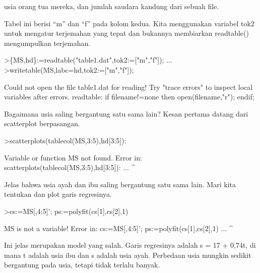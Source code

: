 \documentclass[a4paper,10pt]{article}
\begin{document}
\begin{eulernotebook}
\begin{eulercomment}
\begin{eulercomment}
\begin{eulercomment}
\begin{eulercomment}
\begin{eulercomment}
\begin{eulercomment}
\begin{eulercomment}
\begin{eulercomment}
\begin{eulercomment}
\begin{eulercomment}
\begin{eulercomment}
\begin{eulercomment}
\begin{eulercomment}
\begin{eulercomment}
\begin{eulercomment}
\begin{eulercomment}
\begin{eulercomment}
\begin{eulercomment}
\begin{eulercomment}
usia orang tua mereka, dan jumlah saudara kandung dari sebuah file.

Tabel ini berisi “m” dan “f” pada kolom kedua. Kita menggunakan
variabel tok2 untuk mengatur terjemahan yang tepat dan bukannya
membiarkan readtable() mengumpulkan terjemahan.
\end{eulercomment}
\begin{eulerprompt}
>\{MS,hd\}:=readtable("table1.dat",tok2:=["m","f"]);  ...
>writetable(MS,labc=hd,tok2:=["m","f"]);
\end{eulerprompt}
\begin{euleroutput}
  Could not open the file
  table1.dat
  for reading!
  Try "trace errors" to inspect local variables after errors.
  readtable:
      if filename!=none then open(filename,"r"); endif;
\end{euleroutput}
\begin{eulercomment}
Bagaimana usia saling bergantung satu sama lain? Kesan pertama datang
dari scatterplot berpasangan.
\end{eulercomment}
\begin{eulerprompt}
>scatterplots(tablecol(MS,3:5),hd[3:5]):
\end{eulerprompt}
\begin{euleroutput}
  Variable or function MS not found.
  Error in:
  scatterplots(tablecol(MS,3:5),hd[3:5]): ...
                          ^
\end{euleroutput}
\begin{eulercomment}
Jelas bahwa usia ayah dan ibu saling bergantung satu sama lain. Mari
kita tentukan dan plot garis regresinya.
\end{eulercomment}
\begin{eulerprompt}
>cs:=MS[,4:5]'; ps:=polyfit(cs[1],cs[2],1)
\end{eulerprompt}
\begin{euleroutput}
  MS is not a variable!
  Error in:
  cs:=MS[,4:5]'; ps:=polyfit(cs[1],cs[2],1) ...
              ^
\end{euleroutput}
\begin{eulercomment}
Ini jelas merupakan model yang salah. Garis regresinya adalah s = 17 +
0,74t, di mana t adalah usia ibu dan s adalah usia ayah. Perbedaan
usia mungkin sedikit bergantung pada usia, tetapi tidak terlalu
banyak.


\end{eulercomment}
\end{eulercomment}
\end{eulercomment}
\end{eulercomment}
\end{eulercomment}
\end{eulercomment}
\end{eulercomment}
\end{eulercomment}
\end{eulercomment}
\end{eulercomment}
\end{eulercomment}
\end{eulercomment}
\end{eulercomment}
\end{eulercomment}
\end{eulercomment}
\end{eulercomment}
\end{eulercomment}
\end{eulercomment}
\end{eulercomment}
\end{eulernotebook}
\end{document}
